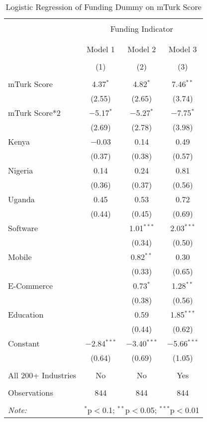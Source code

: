 \documentclass[12pt]{article}
\begin{document}
\begin{table}[!htbp] \centering 
  \caption{Logistic Regression of Funding Dummy on mTurk Score} 
  \label{} 
\begin{tabular}{@{\extracolsep{5pt}}lccc} 
\\[-1.8ex]\hline 
\hline \\[-1.8ex] 
 & \multicolumn{3}{c}{Funding Indicator} \\ 
\cline{2-4} 
\\[-1.8ex] & \multicolumn{3}{c}{} \\ 
 & Model 1 & Model 2 & Model 3 \\ 
\\[-1.8ex] & (1) & (2) & (3)\\ 
\hline \\[-1.8ex] 
 mTurk Score & 4.37$^{*}$ & 4.82$^{*}$ & 7.46$^{**}$ \\ 
  & (2.55) & (2.65) & (3.74) \\ 
  mTurk Score*2 & $-$5.17$^{*}$ & $-$5.27$^{*}$ & $-$7.75$^{*}$ \\ 
  & (2.69) & (2.78) & (3.98) \\ 
  Kenya & $-$0.03 & 0.14 & 0.49 \\ 
  & (0.37) & (0.38) & (0.57) \\ 
  Nigeria & 0.14 & 0.24 & 0.81 \\ 
  & (0.36) & (0.37) & (0.56) \\ 
  Uganda & 0.45 & 0.53 & 0.72 \\ 
  & (0.44) & (0.45) & (0.69) \\ 
  Software &  & 1.01$^{***}$ & 2.03$^{***}$ \\ 
  &  & (0.34) & (0.50) \\ 
  Mobile &  & 0.82$^{**}$ & 0.30 \\ 
  &  & (0.33) & (0.65) \\ 
  E-Commerce &  & 0.73$^{*}$ & 1.28$^{**}$ \\ 
  &  & (0.38) & (0.56) \\ 
  Education &  & 0.59 & 1.85$^{***}$ \\ 
  &  & (0.44) & (0.62) \\ 
  Constant & $-$2.84$^{***}$ & $-$3.40$^{***}$ & $-$5.66$^{***}$ \\ 
  & (0.64) & (0.69) & (1.05) \\ 
  \hline \\[-1.8ex] 
All 200+ Industries & No & No & Yes \\ 
 \hline \\[-1.8ex] 
Observations & 844 & 844 & 844 \\ 
\hline 
\hline \\[-1.8ex] 
\textit{Note:}  & \multicolumn{3}{r}{$^{*}$p$<$0.1; $^{**}$p$<$0.05; $^{***}$p$<$0.01} \\ 
\end{tabular} 
\end{table} 
\end{document}
